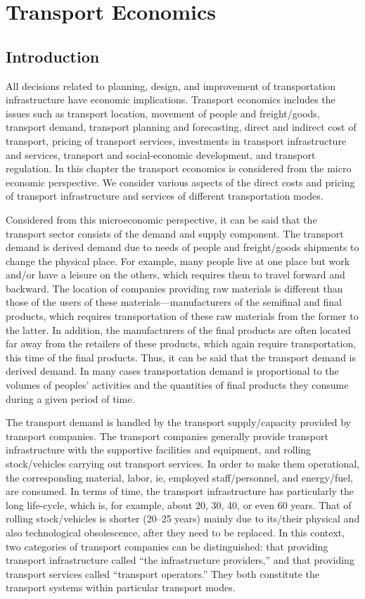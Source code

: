 \chapter{Transport Economics}
%
\section{Introduction}
All decisions related to planning, design, and improvement of transportation infrastructure have economic implications. Transport economics includes the issues such as transport location, movement of people and freight/goods, transport demand, transport planning and forecasting, direct and indirect cost of transport, pricing of transport services, investments in transport infrastructure and services, transport and social-economic development, and transport regulation. In this chapter the transport economics is considered from the micro economic perspective. We consider various aspects of the direct costs and pricing of transport infrastructure and services of different transportation modes.\\
\par
Considered from this microeconomic perspective, it can be said that the transport sector consists of the demand and supply component. The transport demand is derived demand due to needs of people and freight/goods shipments to change the physical place. For example, many people live at one place but work and/or have a leisure on the others, which requires them to travel forward and backward. The location of companies providing raw materials is different than those of the users of these materials—manufacturers of the semifinal and final products, which requires transportation of these raw materials from the former to the latter. In addition, the manufacturers of the final products are often located far away from the retailers of these products, which again require transportation, this time of the final products. Thus, it can be said that the transport demand is derived demand. In many cases transportation demand is proportional to the volumes of peoples’ activities and the quantities of final products they consume during a given period of time.\\
\par
The transport demand is handled by the transport supply/capacity provided by transport companies.
The transport companies generally provide transport infrastructure with the supportive facilities and equipment, and rolling stock/vehicles carrying out transport services. In order to make them operational, the corresponding material, labor, ie, employed staff/personnel, and energy/fuel, are consumed. In terms of time, the transport infrastructure has particularly the long life-cycle, which is, for example, about 20, 30, 40, or even 60 years. That of rolling stock/vehicles is shorter (20–25 years) mainly due to its/their physical and also technological obsolescence, after they need to be replaced. In this context, two categories of transport companies can be distinguished: that providing transport infrastructure called “the infrastructure providers,” and that providing transport services called “transport operators.” They both constitute the transport systems within particular transport modes.\\
